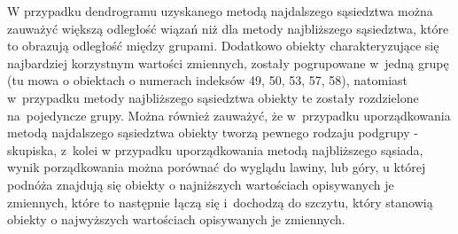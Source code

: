 \documentclass[12pt,a4paper]{report}
\begin{document}
{W przypadku dendrogramu uzyskanego metodą najdalszego sąsiedztwa można
zauważyć większą odległość wiązań niż dla metody najbliższego
sąsiedztwa, które to obrazują odległość między grupami. Dodatkowo
obiekty charakteryzujące się najbardziej korzystnym wartości zmiennych,
zostały pogrupowane w~jedną grupę (tu mowa o obiektach o numerach
indeksów 49, 50, 53, 57, 58), natomiast w~przypadku metody najbliższego
sąsiedztwa obiekty te zostały rozdzielone na~pojedyncze grupy. Można
również zauważyć, że w~przypadku uporządkowania metodą najdalszego
sąsiedztwa obiekty tworzą pewnego rodzaju podgrupy - skupiska, z~kolei w
przypadku uporządkowania metodą najbliższego sąsiada, wynik
porządkowania można porównać do wyglądu lawiny, lub góry, u której
podnóża znajdują się obiekty o najniższych wartościach opisywanych je
zmiennych, które to następnie łączą się i~dochodzą do szczytu, który stanowią
obiekty o najwyższych wartościach opisywanych je zmiennych.

}
\end{document}
